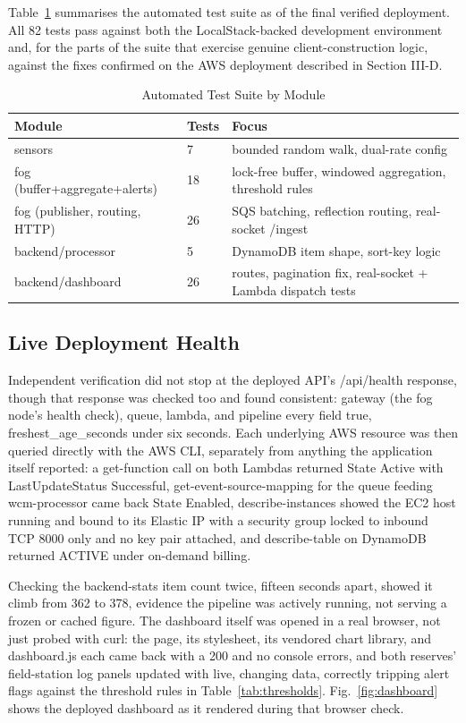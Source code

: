 \documentclass[conference,a4paper]{IEEEtran}
\begin{document}
Table~\ref{tab:tests} summarises the automated test suite as of the final verified deployment. All 82 tests pass against both the LocalStack-backed development environment and, for the parts of the suite that exercise genuine client-construction logic, against the fixes confirmed on the AWS deployment described in Section III-D.

\begin{table}[!t]
\caption{Automated Test Suite by Module}
\label{tab:tests}
\centering\footnotesize
\setlength{\tabcolsep}{3pt}
\begin{tabular}{p{1.26in}p{0.32in}p{1.64in}}
\hline
\textbf{Module} & \textbf{Tests} & \textbf{Focus} \\
\hline
sensors & 7 & bounded random walk, dual-rate config \\
fog (buffer+aggregate+alerts) & 18 & lock-free buffer, windowed aggregation, threshold rules \\
fog (publisher, routing, HTTP) & 26 & SQS batching, reflection routing, real-socket /ingest \\
backend/processor & 5 & DynamoDB item shape, sort-key logic \\
backend/dashboard & 26 & routes, pagination fix, real-socket + Lambda dispatch tests \\
\hline
\end{tabular}
\end{table}

\subsection{Live Deployment Health}

Independent verification did not stop at the deployed API's /api/health response, though that response was checked too and found consistent: gateway (the fog node's health check), queue, lambda, and pipeline every field true, freshest\_age\_seconds under six seconds. Each underlying AWS resource was then queried directly with the AWS CLI, separately from anything the application itself reported: a get-function call on both Lambdas returned State Active with LastUpdateStatus Successful, get-event-source-mapping for the queue feeding wcm-processor came back State Enabled, describe-instances showed the EC2 host running and bound to its Elastic IP with a security group locked to inbound TCP 8000 only and no key pair attached, and describe-table on DynamoDB returned ACTIVE under on-demand billing.

Checking the backend-stats item count twice, fifteen seconds apart, showed it climb from 362 to 378, evidence the pipeline was actively running, not serving a frozen or cached figure. The dashboard itself was opened in a real browser, not just probed with curl: the page, its stylesheet, its vendored chart library, and dashboard.js each came back with a 200 and no console errors, and both reserves' field-station log panels updated with live, changing data, correctly tripping alert flags against the threshold rules in Table~\ref{tab:thresholds}. Fig.~\ref{fig:dashboard} shows the deployed dashboard as it rendered during that browser check.
\end{document}
